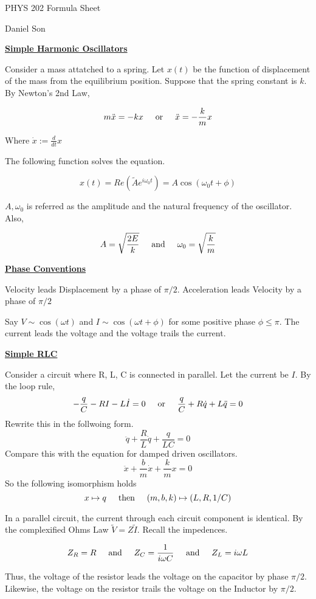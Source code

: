 \documentclass{article}
\newcommand{\new}[1]{
    \vspace{2mm}
    \noindent
    \textbf{
    \underline{#1}}
}
\newcommand{\textOr}{
    {
        \hspace{5mm}
        \textrm{or}
        \hspace{5mm}
    }
}
\newcommand{\textAnd}{
    {
        \hspace{5mm}
        \textrm{and}
        \hspace{5mm}
    }
}
\newcommand{\textThen}{
    {
        \hspace{5mm}
        \textrm{then}
        \hspace{5mm}
    }
}
\newcommand{\Ixp}[1]{
    {
        e^{#1}
    }
}
\begin{document}
\begin{center}
\LARGE
PHYS 202 Formula Sheet

\Large
Daniel Son
\end{center}

\new{Simple Harmonic Oscillators}
Consider a mass attatched to a spring. Let 
$x(t)$ be the function of displacement of the mass 
from the equilibrium position. Suppose that the 
spring constant is $k$. By Newton's 2nd Law,

\[
    m\ddot{x} = -kx
    \textOr 
    \ddot{x} = -\frac k m x
\]

Where $\dot{x} := \frac{d}{dt}x$

The following function solves the equation. 

\[
    x(t) = Re(\tilde{A}\Ixp{i\omega_0 t})
    = A\cos(\omega_0 t + \phi)
\]

$A, \omega_0$ is referred as the amplitude and 
the natural frequency of the oscillator. Also, 

\[
    A = \sqrt\frac{2E}k 
    \textAnd
    \omega_0 = \sqrt\frac k m
\]

\new{Phase Conventions}
Velocity leads Displacement by a phase of $\pi/2$. 
Acceleration leads Velocity by a phase of $\pi/2$

Say $V \sim \cos(\omega t)$ and $I \sim \cos(\omega t + \phi)$
for some positive phase $\phi \leq \pi$. The current leads 
the voltage and the voltage trails the current. 

\new{Simple RLC}
Consider a circuit where R, L, C is connected in 
parallel. Let the current be $I$. By the loop rule, 
\[
    -\frac q C - R I - L \dot{I} = 0
    \textOr
    \frac q C + R \dot{q} + L \ddot{q} = 0 
\]
Rewrite this in the follwoing form. 
\[
    \ddot{q} + \frac R L \dot{q} + \frac q {LC} = 0
\]
Compare this with the equation for damped driven oscillators.  
\[
    \ddot{x} + \frac b m \dot{x} + \frac k m x = 0
\]
So the following isomorphism holds
\[
    x \mapsto q \textThen
    (m, b, k) \mapsto (L, R, 1/C)
\]

In a parallel circuit, the current through each 
circuit component is identical. By the complexified 
Ohms Law $\tilde V = Z \tilde I$. Recall the 
impedences. 

\[
    Z_R = R\textAnd Z_C = \frac{1}{i\omega C}\textAnd Z_L = i\omega L
\]

Thus, the voltage of the resistor leads the voltage on 
the capacitor by phase $\pi/2$. Likewise, the voltage 
on the resistor trails the voltage on the Inductor by $\pi/2$.
\end{document}
